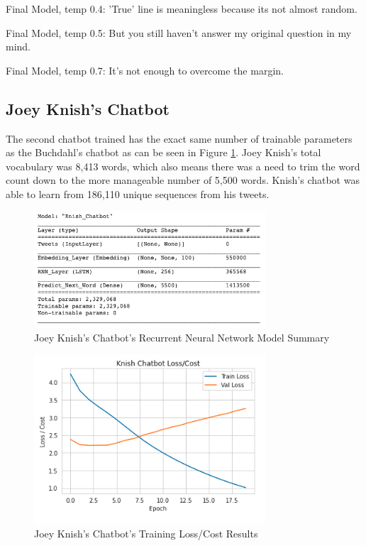 \documentclass[5p,authoryear]{elsarticle}
\begin{document}
Final Model, temp 0.4: 'True' line is meaningless because its not almost random.

Final Model, temp 0.5: But you still haven't answer my original question in my mind.

Final Model, temp 0.7: It's not enough to overcome the margin.


\subsection{Joey Knish’s Chatbot}

The second chatbot trained has the exact same number of trainable parameters as the Buchdahl’s chatbot as can be seen in Figure \ref{Knish Summary}. Joey Knish’s total vocabulary was 8,413 words, which also means there was a need to trim the word count down to the more manageable number of 5,500 words. Knish’s chatbot was able to learn from 186,110 unique sequences from his tweets.


\begin{figure}[!htb] \centering
	\includegraphics[width=3.4in]{figures/Knish_Model.png}
	\caption[]{Joey Knish’s Chatbot’s Recurrent Neural Network Model Summary} 
	\label{Knish Summary} 
\end{figure}


\begin{figure}[!htb] \centering
	\includegraphics[width=3.4in]{figures/Knish_Loss.png}
	\caption[]{Joey Knish’s Chatbot’s Training Loss/Cost Results} 
	\label{Knish Loss} 
\end{figure}
\end{document}
